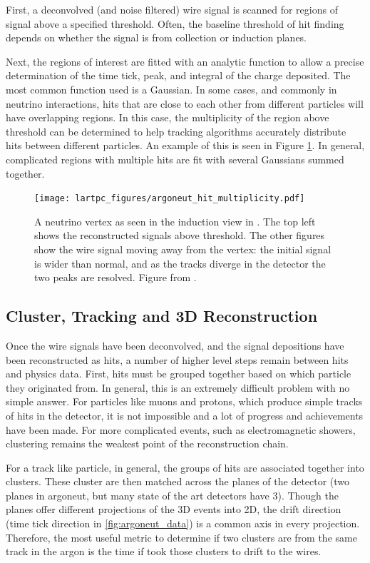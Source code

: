 First, a deconvolved (and noise filtered) wire signal is scanned for regions of signal above a specified threshold.  Often, the baseline threshold of hit finding depends on whether the signal is from collection or induction planes.

Next, the regions of interest are fitted with an analytic function to allow a precise determination of the time tick, peak, and integral of the charge deposited.  The most common function used is a Gaussian.  In some cases, and commonly in neutrino interactions, hits that are close to each other from different particles will have overlapping regions.  In this case, the multiplicity of the region above threshold can be determined to help tracking algorithms accurately distribute hits between different particles.  An example of this is seen in Figure \ref{fig:argoneut_hit_multiplicity}.  In general, complicated regions with multiple hits are fit with several Gaussians summed together.

\begin{figure}[h]
  \centering
  \texttt{[image: lartpc\_figures/argoneut\_hit\_multiplicity.pdf]}
  \caption[Hit Finding in \argoneut]{A neutrino vertex as seen in the induction view in \argoneut.  The top left shows the reconstructed signals above threshold.  The other figures show the wire signal moving away from the vertex: the initial signal is wider than normal, and as the tracks diverge in the detector the two peaks are resolved.  Figure from \cite{Anderson:2012vc}.}
  \label{fig:argoneut_hit_multiplicity}
\end{figure}

\subsection{Cluster, Tracking and 3D Reconstruction}

Once the wire signals have been deconvolved, and the signal depositions have been reconstructed as hits, a number of higher level steps remain between hits and physics data.  First, hits must be grouped together based on which particle they originated from.  In general, this is an extremely difficult problem with no simple answer.  For particles like muons and protons, which produce simple tracks of hits in the detector, it is not impossible and a lot of progress and achievements have been made.  For more complicated events, such as electromagnetic showers, clustering remains the weakest point of the reconstruction chain.

For a track like particle, in general, the groups of hits are associated together into clusters.  These cluster are then matched across the planes of the detector (two planes in argoneut, but many state of the art detectors have 3).  Though the planes offer different projections of the 3D events into 2D, the drift direction (time tick direction in \ref{fig:argoneut_data}) is a common axis in every projection.  Therefore, the most useful metric to determine if two clusters are from the same track in the argon is the time if took those clusters to drift to the wires.

